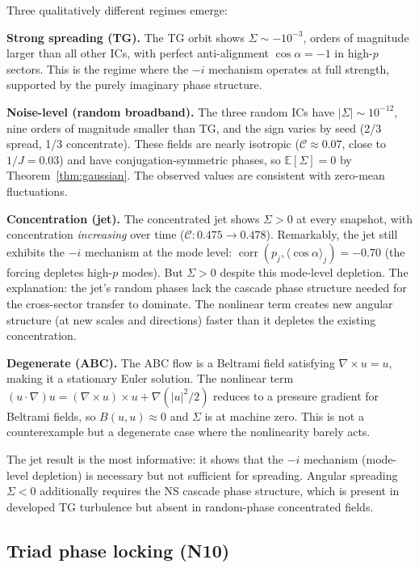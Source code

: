 \documentclass[11pt]{article}
\theoremstyle{definition}
\newcommand{\E}{\mathbb{E}}
\newcommand{\cC}{\mathcal{C}}
\DeclareMathOperator{\corr}{corr}
\begin{document}
Three qualitatively different regimes emerge:

\medskip\noindent\textbf{Strong spreading (TG).}
The TG orbit shows $\Sigma \sim -10^{-3}$, orders of
magnitude larger than all other ICs, with perfect
anti-alignment $\cos\alpha=-1$ in high-$p$ sectors.
This is the regime where the $-i$ mechanism operates
at full strength, supported by the purely imaginary
phase structure.

\medskip\noindent\textbf{Noise-level (random broadband).}
The three random ICs have $|\Sigma|\sim 10^{-12}$,
nine orders of magnitude smaller than TG, and the sign
varies by seed (2/3 spread, 1/3 concentrate).  These
fields are nearly isotropic ($\cC\approx 0.07$, close
to $1/J=0.03$) and have conjugation-symmetric phases,
so $\E[\Sigma]=0$ by Theorem~\ref{thm:gaussian}.
The observed values are consistent with zero-mean
fluctuations.

\medskip\noindent\textbf{Concentration (jet).}
The concentrated jet shows $\Sigma > 0$ at every snapshot,
with concentration \emph{increasing} over time
($\cC: 0.475\to 0.478$).  Remarkably, the jet still
exhibits the $-i$ mechanism at the mode level:
$\corr(p_j,\langle\cos\alpha\rangle_j) = -0.70$
(the forcing depletes high-$p$ modes).  But $\Sigma>0$
despite this mode-level depletion.  The explanation:
the jet's random phases lack the cascade phase structure
needed for the cross-sector transfer to dominate.
The nonlinear term creates new angular structure
(at new scales and directions) faster than it depletes
the existing concentration.

\medskip\noindent\textbf{Degenerate (ABC).}
The ABC flow is a Beltrami field satisfying
$\nabla\times u=u$, making it a stationary Euler solution.
The nonlinear term $(u\cdot\nabla)u = (\nabla\times u)
\times u + \nabla(|u|^2/2)$ reduces to a pressure gradient
for Beltrami fields, so $B(u,u)\approx 0$ and $\Sigma$
is at machine zero.  This is not a counterexample but
a degenerate case where the nonlinearity barely acts.

\medskip
The jet result is the most informative: it shows that
the $-i$ mechanism (mode-level depletion) is necessary
but not sufficient for spreading.  Angular spreading
$\Sigma<0$ additionally requires the NS cascade phase
structure, which is present in developed TG turbulence
but absent in random-phase concentrated fields.


\subsection{Triad phase locking (N10)}
\label{sec:triad-phase}
\end{document}
